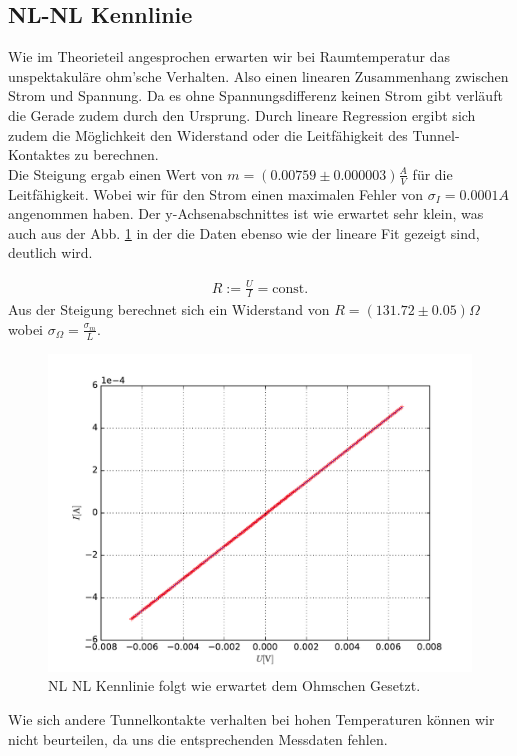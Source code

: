 \documentclass[twoside,        %
               BCOR12mm,       %
               english,ngerman, %
               fleqn,headsepline=false,footsepline=false
              ]{MFPREPORT}
\begin{document}
\subsection{NL-NL Kennlinie}

Wie im Theorieteil angesprochen erwarten wir bei Raumtemperatur das unspektakuläre ohm'sche Verhalten. 
Also einen linearen Zusammenhang zwischen Strom und Spannung.
Da es ohne Spannungsdifferenz keinen Strom gibt verläuft die Gerade zudem durch den Ursprung.
Durch lineare Regression ergibt sich zudem die Möglichkeit den Widerstand oder die Leitfähigkeit des Tunnel-Kontaktes zu berechnen.
\\
Die Steigung ergab einen Wert von $m = (0.00759  \pm 0.000003)  \frac{A}{V}$ für die Leitfähigkeit. Wobei wir für den Strom einen maximalen Fehler von $ \sigma_{I}=0.0001 A$ angenommen haben. 
Der y-Achsenabschnittes ist wie erwartet sehr klein, was auch aus der Abb. \ref{fig:NLNL} in der die Daten ebenso wie der lineare Fit gezeigt sind, deutlich wird.

\begin{align}
R:={\frac UI}={\mathrm {const.}}
\end{align}
Aus der Steigung berechnet sich ein Widerstand von $R=(131.72 \pm 0.05) \Omega$ wobei $\sigma_{\Omega} = \frac{\sigma_{m}}{L} $.
\begin{figure}[h]
\includegraphics[scale=0.9]{1.pdf}
\caption{NL NL Kennlinie folgt wie erwartet dem Ohmschen Gesetzt.}
\label{fig:NLNL}
\end{figure}
Wie sich andere Tunnelkontakte verhalten bei hohen Temperaturen können wir nicht beurteilen, da uns die entsprechenden Messdaten fehlen.
\end{document}
